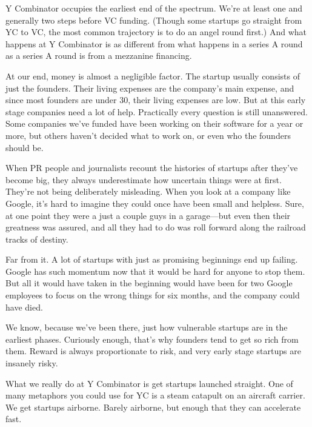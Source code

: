 Y Combinator occupies the earliest end of the spectrum. We're at least
one and generally two steps before VC funding. (Though some startups go
straight from YC to VC, the most common trajectory is to do an angel
round first.) And what happens at Y Combinator is as different from what
happens in a series A round as a series A round is from a mezzanine
financing.

At our end, money is almost a negligible factor. The startup usually
consists of just the founders. Their living expenses are the company's
main expense, and since most founders are under 30, their living
expenses are low. But at this early stage companies need a lot of help.
Practically every question is still unanswered. Some companies we've
funded have been working on their software for a year or more, but
others haven't decided what to work on, or even who the founders should
be.

When PR people and journalists recount the histories of startups after
they've become big, they always underestimate how uncertain things were
at first. They're not being deliberately misleading. When you look at a
company like Google, it's hard to imagine they could once have been
small and helpless. Sure, at one point they were a just a couple guys in
a garage---but even then their greatness was assured, and all they had
to do was roll forward along the railroad tracks of destiny.

Far from it. A lot of startups with just as promising beginnings end up
failing. Google has such momentum now that it would be hard for anyone
to stop them. But all it would have taken in the beginning would have
been for two Google employees to focus on the wrong things for six
months, and the company could have died.

We know, because we've been there, just how vulnerable startups are in
the earliest phases. Curiously enough, that's why founders tend to get
so rich from them. Reward is always proportionate to risk, and very
early stage startups are insanely risky.

What we really do at Y Combinator is get startups launched straight. One
of many metaphors you could use for YC is a steam catapult on an
aircraft carrier. We get startups airborne. Barely airborne, but enough
that they can accelerate fast.

